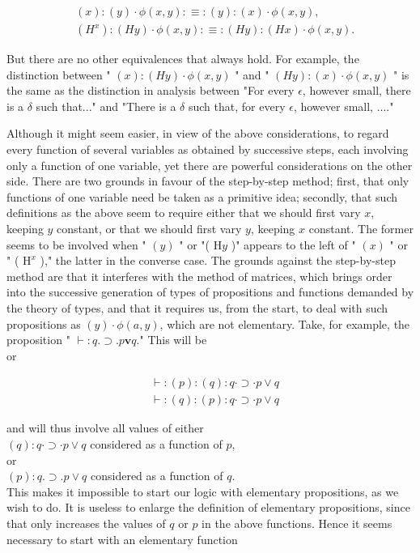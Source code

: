 \documentclass[10pt]{article}
\begin{document}
$$
\begin{aligned}
&(x):(y) \cdot \phi(x, y): \equiv:(y):(x) \cdot \phi(x, y), \\
&\left(H^{x}\right):(H y) \cdot \phi(x, y): \equiv:(H y):(H x) \cdot \phi(x, y) .
\end{aligned}
$$

But there are no other equivalences that always hold. For example, the distinction between " $(x):(H y) \cdot \phi(x, y)$ " and " $(H y):(x) \cdot \phi(x, y)$ " is the same as the distinction in analysis between "For every $\epsilon$, however small, there is a $\delta$ such that..." and "There is a $\delta$ such that, for every $\epsilon$, however small, ...."

Although it might seem easier, in view of the above considerations, to regard every function of several variables as obtained by successive steps, each involving only a function of one variable, yet there are powerful considerations on the other side. There are two grounds in favour of the step-by-step method; first, that only functions of one variable need be taken as a primitive idea; secondly, that such definitions as the above seem to require either that we should first vary $x$, keeping $y$ constant, or that we should first vary $y$, keeping $x$ constant. The former seems to be involved when " $(y)$ " or "( $\mathrm{H} y$ )" appears to the left of " $(x)$ " or " ( $\mathrm{H}^{x}$ )," the latter in the converse case. The grounds against the step-by-step method are that it interferes with the method of matrices, which brings order into the successive generation of types of propositions and functions demanded by the theory of types, and that it requires us, from the start, to deal with such propositions as $(y) \cdot \phi(a, y)$, which are not elementary. Take, for example, the proposition " $\vdash: q . \supset . p \mathbf{v} q$." This will be\\
or

$$
\begin{aligned}
& \vdash:(p):(q): q \cdot \supset \cdot p \vee q \\
& \vdash:(q):(p): q \cdot \supset \cdot p \vee q
\end{aligned}
$$

and will thus involve all values of either\\
$(q): q \cdot \supset \cdot p \vee q$ considered as a function of $p$,\\
or\\
$(p): q . \supset . p \vee q$ considered as a function of $q$.\\
This makes it impossible to start our logic with elementary propositions, as we wish to do. It is useless to enlarge the definition of elementary propositions, since that only increases the values of $q$ or $p$ in the above functions. Hence it seems necessary to start with an elementary function
\end{document}

